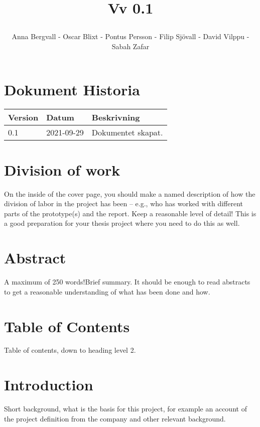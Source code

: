 \documentclass[12pt]{article}
\date {#1}
\title {
    \documentNumber {01}    

    \documentTitle {Helsingborg Event and Convention Bureau}
    
    \documentDate {2021-09-29}
    \documentVersion Vv 0.1
    
    \author{Anna Bergvall - Oscar Blixt - Pontus Persson - Filip Sjövall - David Vilppu - Sabah Zafar }
}
\begin{document}
\maketitle

\thispagestyle{empty}



\newpage

\tableofcontents


\newpage

\section{Dokument Historia}
\begin{tabular}{ l | l | l }
    Version & Datum & Beskrivning \\
    \hline
    0.1 & 2021-09-29 & Dokumentet skapat. \\
     \hline
   
   
\end{tabular}

\newpage

\section{Division of work}
On the inside of the cover page, you should make a named description of how the division of labor in the project has been – e.g., who has worked with different parts of the prototype(s) and the report. Keep a reasonable level of detail! This is a good preparation for your thesis project where you need to do this as well.

\section{Abstract}
A maximum of 250 words!Brief summary. It should be enough to read abstracts to get a reasonable understanding of what has been done and how.

\section{Table of Contents}
Table of contents, down to heading level 2.

\section{Introduction}
Short background, what is the basis for this project, for example an account of the project definition from the company and other relevant background.
\end{document}
